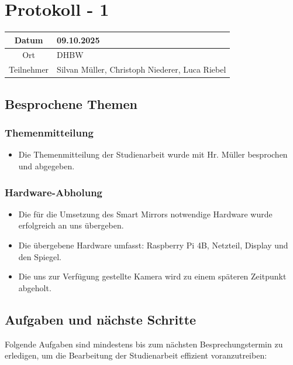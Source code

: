 \chapter{Protokoll - 1}

\begin{table}[H]
    \centering
    \begin{tabular}{|c|l|}
        \hline
        Datum& 09.10.2025\\
        \hline
        Ort& DHBW\\
        \hline
        Teilnehmer& Silvan Müller, Christoph Niederer, Luca Riebel\\
        \hline
    \end{tabular}
\end{table}

\section{Besprochene Themen}
\subsection{Themenmitteilung}
\begin{itemize}
    \item Die Themenmitteilung der Studienarbeit wurde mit Hr. Müller besprochen und abgegeben.
\end{itemize}

\subsection{Hardware-Abholung}
\begin{itemize}
    \item Die für die Umsetzung des Smart Mirrors notwendige Hardware wurde erfolgreich an uns übergeben.
    \item Die übergebene Hardware umfasst: Raspberry Pi 4B, Netzteil, Display und den Spiegel.
    \item Die uns zur Verfügung gestellte Kamera wird zu einem späteren Zeitpunkt abgeholt.
\end{itemize}

\section{Aufgaben und nächste Schritte}
Folgende Aufgaben sind mindestens bis zum nächsten Besprechungstermin zu erledigen, um die Bearbeitung der Studienarbeit effizient voranzutreiben:

